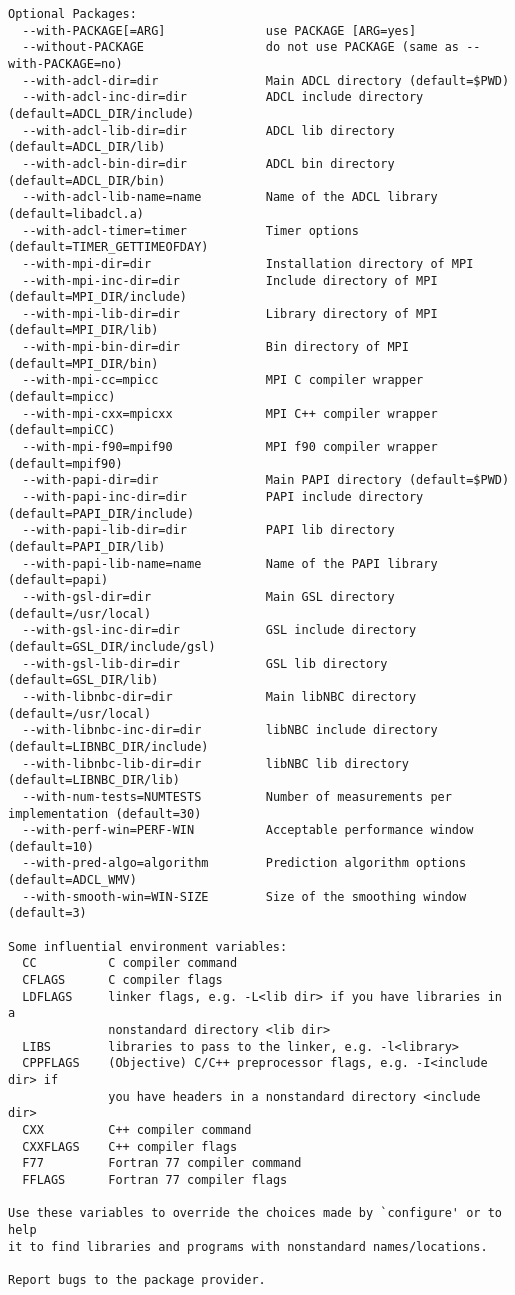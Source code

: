 \begin{verbatim}
Optional Packages:
  --with-PACKAGE[=ARG]              use PACKAGE [ARG=yes]
  --without-PACKAGE                 do not use PACKAGE (same as --with-PACKAGE=no)
  --with-adcl-dir=dir               Main ADCL directory (default=$PWD)
  --with-adcl-inc-dir=dir           ADCL include directory (default=ADCL_DIR/include)
  --with-adcl-lib-dir=dir           ADCL lib directory (default=ADCL_DIR/lib)
  --with-adcl-bin-dir=dir           ADCL bin directory (default=ADCL_DIR/bin)
  --with-adcl-lib-name=name         Name of the ADCL library (default=libadcl.a)
  --with-adcl-timer=timer           Timer options (default=TIMER_GETTIMEOFDAY)
  --with-mpi-dir=dir                Installation directory of MPI
  --with-mpi-inc-dir=dir            Include directory of MPI (default=MPI_DIR/include)
  --with-mpi-lib-dir=dir            Library directory of MPI (default=MPI_DIR/lib)
  --with-mpi-bin-dir=dir            Bin directory of MPI (default=MPI_DIR/bin)
  --with-mpi-cc=mpicc               MPI C compiler wrapper (default=mpicc)
  --with-mpi-cxx=mpicxx             MPI C++ compiler wrapper (default=mpiCC)
  --with-mpi-f90=mpif90             MPI f90 compiler wrapper (default=mpif90)
  --with-papi-dir=dir               Main PAPI directory (default=$PWD)
  --with-papi-inc-dir=dir           PAPI include directory (default=PAPI_DIR/include)
  --with-papi-lib-dir=dir           PAPI lib directory (default=PAPI_DIR/lib)
  --with-papi-lib-name=name         Name of the PAPI library (default=papi)
  --with-gsl-dir=dir                Main GSL directory (default=/usr/local)
  --with-gsl-inc-dir=dir            GSL include directory (default=GSL_DIR/include/gsl)
  --with-gsl-lib-dir=dir            GSL lib directory (default=GSL_DIR/lib)
  --with-libnbc-dir=dir             Main libNBC directory (default=/usr/local)
  --with-libnbc-inc-dir=dir         libNBC include directory (default=LIBNBC_DIR/include)
  --with-libnbc-lib-dir=dir         libNBC lib directory (default=LIBNBC_DIR/lib)
  --with-num-tests=NUMTESTS         Number of measurements per implementation (default=30)
  --with-perf-win=PERF-WIN          Acceptable performance window (default=10)
  --with-pred-algo=algorithm        Prediction algorithm options (default=ADCL_WMV)
  --with-smooth-win=WIN-SIZE        Size of the smoothing window (default=3)

Some influential environment variables:
  CC          C compiler command
  CFLAGS      C compiler flags
  LDFLAGS     linker flags, e.g. -L<lib dir> if you have libraries in a
              nonstandard directory <lib dir>
  LIBS        libraries to pass to the linker, e.g. -l<library>
  CPPFLAGS    (Objective) C/C++ preprocessor flags, e.g. -I<include dir> if
              you have headers in a nonstandard directory <include dir>
  CXX         C++ compiler command
  CXXFLAGS    C++ compiler flags
  F77         Fortran 77 compiler command
  FFLAGS      Fortran 77 compiler flags

Use these variables to override the choices made by `configure' or to help
it to find libraries and programs with nonstandard names/locations.

Report bugs to the package provider.
\end{verbatim}
